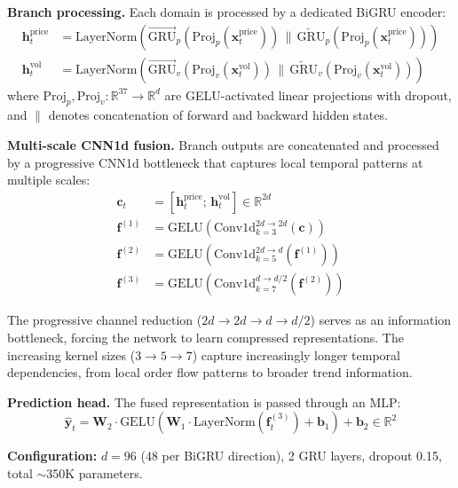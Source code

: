 \documentclass[11pt,a4paper]{article}
\newcommand{\R}{\mathbb{R}}
\newcommand{\bx}{\mathbf{x}}
\newcommand{\bh}{\mathbf{h}}
\newcommand{\by}{\mathbf{y}}
\newcommand{\bW}{\mathbf{W}}
\begin{document}
\textbf{Branch processing.} Each domain is processed by a dedicated BiGRU encoder:
\begin{align}
    \bh_t^{\text{price}} &= \text{LayerNorm}\!\left(\overrightarrow{\text{GRU}}_p(\text{Proj}_p(\bx_t^{\text{price}})) \,\|\, \overleftarrow{\text{GRU}}_p(\text{Proj}_p(\bx_t^{\text{price}}))\right) \label{eq:price_gru} \\
    \bh_t^{\text{vol}} &= \text{LayerNorm}\!\left(\overrightarrow{\text{GRU}}_v(\text{Proj}_v(\bx_t^{\text{vol}})) \,\|\, \overleftarrow{\text{GRU}}_v(\text{Proj}_v(\bx_t^{\text{vol}}))\right) \label{eq:vol_gru}
\end{align}
where $\text{Proj}_p, \text{Proj}_v: \R^{37} \to \R^d$ are GELU-activated linear projections with dropout, and $\|$ denotes concatenation of forward and backward hidden states.

\textbf{Multi-scale CNN1d fusion.} Branch outputs are concatenated and processed by a progressive CNN1d bottleneck that captures local temporal patterns at multiple scales:
\begin{align}
    \mathbf{c}_t &= [\bh_t^{\text{price}};\, \bh_t^{\text{vol}}] \in \R^{2d} \label{eq:concat} \\
    \mathbf{f}^{(1)} &= \text{GELU}\!\left(\text{Conv1d}_{k=3}^{2d \to 2d}(\mathbf{c})\right) \label{eq:cnn1} \\
    \mathbf{f}^{(2)} &= \text{GELU}\!\left(\text{Conv1d}_{k=5}^{2d \to d}(\mathbf{f}^{(1)})\right) \label{eq:cnn2} \\
    \mathbf{f}^{(3)} &= \text{GELU}\!\left(\text{Conv1d}_{k=7}^{d \to d/2}(\mathbf{f}^{(2)})\right) \label{eq:cnn3}
\end{align}

The progressive channel reduction ($2d \to 2d \to d \to d/2$) serves as an information bottleneck, forcing the network to learn compressed representations. The increasing kernel sizes ($3 \to 5 \to 7$) capture increasingly longer temporal dependencies, from local order flow patterns to broader trend information.

\textbf{Prediction head.} The fused representation is passed through an MLP:
\begin{equation}
    \hat{\by}_t = \bW_2 \cdot \text{GELU}(\bW_1 \cdot \text{LayerNorm}(\mathbf{f}_t^{(3)}) + \mathbf{b}_1) + \mathbf{b}_2 \in \R^2
    \label{eq:cnn_head}
\end{equation}

\textbf{Configuration:} $d = 96$ (48 per BiGRU direction), 2 GRU layers, dropout 0.15, total $\sim$350K parameters.
\end{document}
